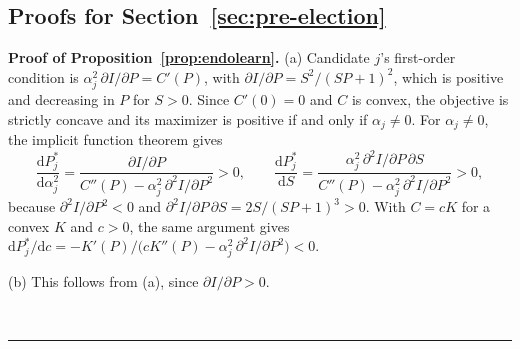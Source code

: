 \documentclass[12pt,letterpaper]{article}
\newenvironment{proof}[1][Proof]{\noindent\textbf{#1.} }{\ \rule{0.5em}{0.5em}}
\begin{document}
\subsection*{Proofs for Section~\ref{sec:pre-election}}

\begin{proof}[Proof of Proposition~\ref{prop:endolearn}]
(a) Candidate $j$'s first-order condition is $\alpha_j^2\,\partial I/\partial P=C'(P)$, with $\partial I/\partial P=S^2/(SP+1)^2$, which is positive and decreasing in $P$ for $S>0$. Since $C'(0)=0$ and $C$ is convex, the objective is strictly concave and its maximizer is positive if and only if $\alpha_j\ne0$. For $\alpha_j\ne0$, the implicit function theorem gives
\[
\frac{\mathrm{d}P_j^*}{\mathrm{d}\alpha_j^2}=\frac{\partial I/\partial P}{C''(P)-\alpha_j^2\,\partial^2I/\partial P^2}>0,
\qquad
\frac{\mathrm{d}P_j^*}{\mathrm{d}S}=\frac{\alpha_j^2\,\partial^2I/\partial P\,\partial S}{C''(P)-\alpha_j^2\,\partial^2I/\partial P^2}>0,
\]
because $\partial^2I/\partial P^2<0$ and $\partial^2I/\partial P\,\partial S=2S/(SP+1)^3>0$. With $C=cK$ for a convex $K$ and $c>0$, the same argument gives $\mathrm{d}P_j^*/\mathrm{d}c=-K'(P)/\big(cK''(P)-\alpha_j^2\,\partial^2I/\partial P^2\big)<0$.

(b) This follows from (a), since $\partial I/\partial P>0$.


\end{proof}
\end{document}
